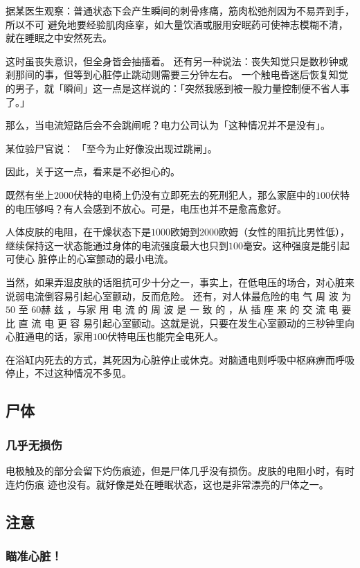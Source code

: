 \documentclass[UTF8]{ctexart}
\begin{document}
据某医生观察：普通状态下会产生瞬间的刺骨疼痛，筋肉松弛剂因为不易弄到手，所以不可 避免地要经验肌肉痉挛，如大量饮酒或服用安眠药可使神志模糊不清，就在睡眠之中安然死去。

这时虽丧失意识，但全身皆会抽搐着。
还有另一种说法：丧失知觉只是数秒钟或剎那间的事，但等到心脏停止跳动则需要三分钟左右。
一个触电昏迷后恢复知觉的男子，就「瞬间」这一点是这样说的：「突然我感到被一股力量控制便不省人事了。」

那么，当电流短路后会不会跳闸呢？电力公司认为「这种情况并不是没有」。

某位验尸官说：
「至今为止好像没出现过跳闸」。

因此，关于这一点，看来是不必担心的。

既然有坐上$2000$伏特的电椅上仍没有立即死去的死刑犯人，那么家庭中的$100$伏特的电压够吗？有人会感到不放心。可是，电压也并不是愈高愈好。

人体皮肤的电阻，在干燥状态下是$1000$欧姆到$2000$欧姆（女性的阻抗比男性低），
继续保持这一状态能通过身体的电流强度最大也只到$100$毫安。这种强度是能引起可使心
脏停止的心室颤动的最小电流。

当然，如果弄湿皮肤的话阻抗可少十分之一，事实上，在低电压的场合，对心脏来说弱电流倒容易引起心室颤动，反而危险。
还有，对人体最危险的电 气 周 波 为 $50$ 至 $60$赫 兹 ，与家 用 电 流 的 周 波 是 一 致 的 ，从 插 座 来 的 交 流 电 要 比 直 流 电 更 容 易引起心室颤动。这就是说，只要在发生心室颤动的三秒钟里向心脏通电的话，家用$100$伏特电压也能完全电死人。

在浴缸内死去的方式，其死因为心脏停止或休克。对脑通电则呼吸中枢麻痹而呼吸停止，不过这种情况不多见。

\subsection{尸体}

\subsubsection*{几乎无损伤}

电极触及的部分会留下灼伤痕迹，但是尸体几乎没有损伤。皮肤的电阻小时，有时连灼伤痕
迹也没有。就好像是处在睡眠状态，这也是非常漂亮的尸体之一。

\subsection{注意}

\subsubsection*{瞄准心脏！}
\end{document}
